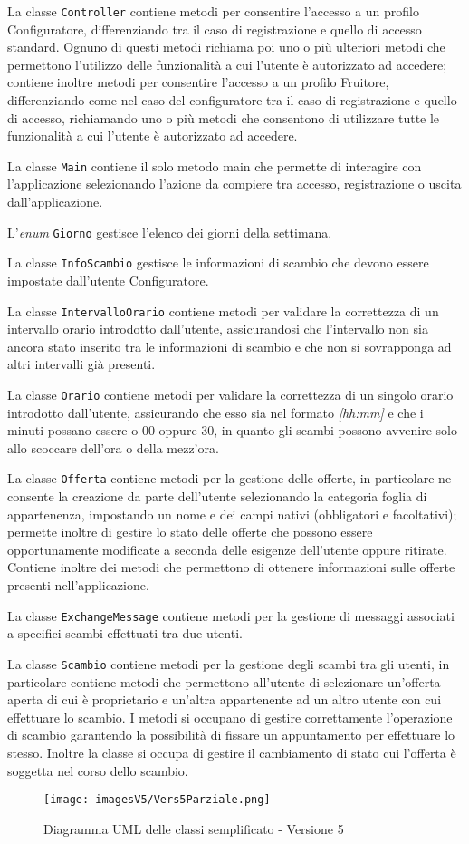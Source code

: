 La classe \texttt{Controller} contiene metodi per consentire l'accesso a un profilo Configuratore, differenziando tra il caso di registrazione e quello di accesso standard. Ognuno di questi metodi richiama poi uno o più ulteriori metodi che permettono l'utilizzo delle funzionalità a cui l'utente è autorizzato ad accedere; contiene inoltre metodi per consentire l'accesso a un profilo Fruitore, differenziando come nel caso del configuratore tra il caso di registrazione e quello di accesso, richiamando uno o più metodi che consentono di utilizzare tutte le funzionalità a cui l'utente è autorizzato ad accedere.

La classe \texttt{Main} contiene il solo metodo main che permette di interagire con l'applicazione selezionando l'azione da compiere tra accesso, registrazione o uscita dall'applicazione.

L'\textit{enum} \texttt{Giorno} gestisce l'elenco dei giorni della settimana.

La classe \texttt{InfoScambio} gestisce le informazioni di scambio che devono essere impostate dall'utente Configuratore.

La classe \texttt{IntervalloOrario} contiene metodi per validare la correttezza di un intervallo orario introdotto dall'utente, assicurandosi che l'intervallo non sia ancora stato inserito tra le informazioni di scambio e che non si sovrapponga ad altri intervalli già presenti.

La classe \texttt{Orario} contiene metodi per validare la correttezza di un singolo orario introdotto dall'utente, assicurando che esso sia nel formato \textit{[hh:mm]} e che i minuti possano essere o 00 oppure 30, in quanto gli scambi possono avvenire solo allo scoccare dell'ora o della mezz'ora.

La classe \texttt{Offerta} contiene metodi per la gestione delle offerte, in particolare ne consente la creazione da parte dell'utente selezionando la categoria foglia di appartenenza, impostando un nome e dei campi nativi (obbligatori e facoltativi); permette inoltre di gestire lo stato delle offerte che possono essere opportunamente modificate a seconda delle esigenze dell'utente oppure ritirate. Contiene inoltre dei metodi che permettono di ottenere informazioni sulle offerte presenti nell'applicazione.

La classe \texttt{ExchangeMessage} contiene metodi per la gestione di messaggi associati a specifici scambi effettuati tra due utenti.

La classe \texttt{Scambio} contiene metodi per la gestione degli scambi tra gli utenti, in particolare contiene metodi che permettono all'utente di selezionare un'offerta aperta di cui è proprietario e un'altra appartenente ad un altro utente con cui effettuare lo scambio. I metodi si occupano di gestire correttamente l'operazione di scambio garantendo la possibilità di fissare un appuntamento per effettuare lo stesso. Inoltre la classe si occupa di gestire il cambiamento di stato cui l'offerta è soggetta nel corso dello scambio.

\begin{figure}[bh]
    \centering
    \texttt{[image: imagesV5/Vers5Parziale.png]}
    \caption{\label{fig:Simplified Class Diagram - v5}Diagramma UML delle classi semplificato - Versione 5}
\end{figure}
\bigskip